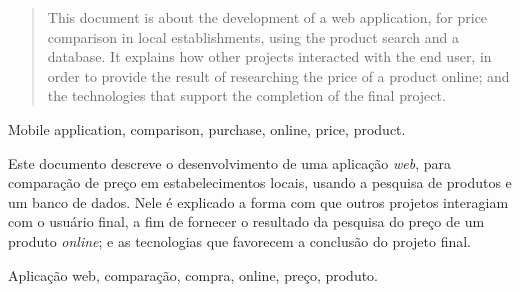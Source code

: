\begin{abstract}
This document is about the development of a web application, for price comparison in local establishments, using the product search and a database. It explains how other projects interacted with the end user, in order to provide the result of researching the price of a product online; and the technologies that support the completion of the final project.
\end{abstract}

\begin{keywords}
Mobile application, comparison, purchase, online, price, product.
\end{keywords}

\begin{resumo}
Este documento descreve o desenvolvimento de uma aplicação \textit{web}, para comparação de preço em estabelecimentos locais, usando a pesquisa de produtos e um banco de dados. Nele é explicado a forma com que outros projetos interagiam com o usuário final, a fim de fornecer o resultado da pesquisa do preço de um produto \textit{online}; e as tecnologias que favorecem a conclusão do projeto final.
\end{resumo}

\begin{palavrasChaves}
Aplicação web, comparação, compra, online, preço, produto.
\end{palavrasChaves}

